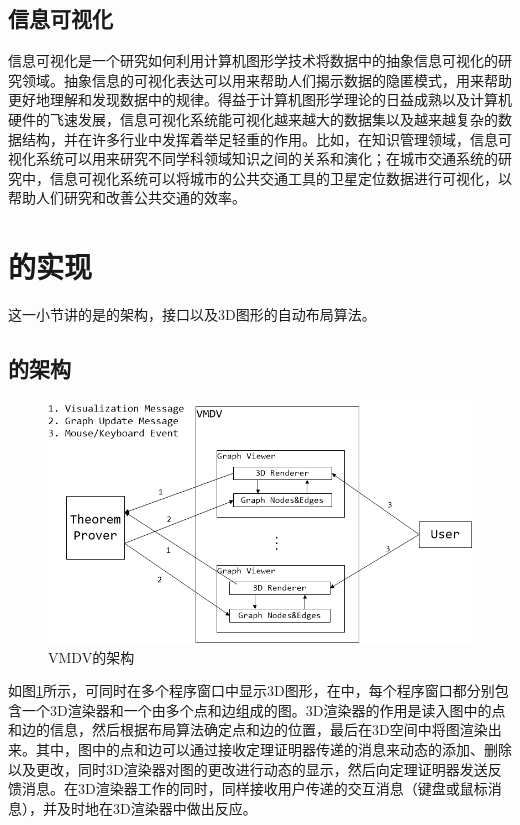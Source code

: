 \subsection{信息可视化}
信息可视化是一个研究如何利用计算机图形学技术将数据中的抽象信息可视化的研究领域。抽象信息的可视化表达可以用来帮助人们揭示数据的隐匿模式，用来帮助更好地理解和发现数据中的规律。得益于计算机图形学理论的日益成熟以及计算机硬件的飞速发展，信息可视化系统能可视化越来越大的数据集以及越来越复杂的数据结构，并在许多行业中发挥着举足轻重的作用。比如，在知识管理领域，信息可视化系统可以用来研究不同学科领域知识之间的关系和演化\cite{ZHHW16}；在城市交通系统的研究中，信息可视化系统可以将城市的公共交通工具的卫星定位数据进行可视化，以帮助人们研究和改善公共交通的效率\cite{FYL15}。

\section{的实现}
这一小节讲的是的架构，接口以及3D图形的自动布局算法。
\subsection{的架构}
\begin{figure}[!h]
	\scriptsize
	\centering
	\includegraphics[width=12cm]{./Img/architecture.png}
	\caption{\textsf{VMDV}的架构}
	\label{fig:architecture}
\end{figure}
如图\ref{fig:architecture}所示，可同时在多个程序窗口中显示3D图形，在中，每个程序窗口都分别包含一个3D渲染器和一个由多个点和边组成的图。3D渲染器的作用是读入图中的点和边的信息，然后根据布局算法确定点和边的位置，最后在3D空间中将图渲染出来。其中，图中的点和边可以通过接收定理证明器传递的消息来动态的添加、删除以及更改，同时3D渲染器对图的更改进行动态的显示，然后向定理证明器发送反馈消息。在3D渲染器工作的同时，同样接收用户传递的交互消息（键盘或鼠标消息），并及时地在3D渲染器中做出反应。

